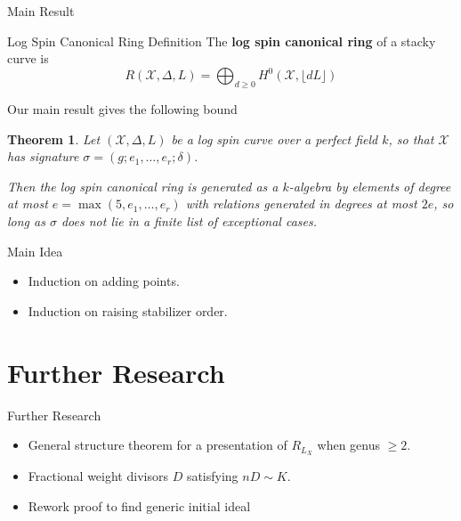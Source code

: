 \documentclass{beamer}
\newtheorem{thm}{Theorem}
\theoremstyle{remark}
\newcommand \sx{{\mathscr X}}
\newcommand{\halfcan}{L}
\begin{document}

\begin{frame}{Main Result}
\begin{alertblock}{Log Spin Canonical Ring Definition}
The \textbf{log spin canonical ring} of a stacky curve is
\[
	R(\sx, \Delta, \halfcan) = \bigoplus_{d \geq 0} H^0(\sx, \lfloor d \halfcan \rfloor)
\]
\end{alertblock}

Our main result gives the following bound


\begin{thm}
\label{thm:main}
Let $(\sx, \Delta, \halfcan)$ be a log spin curve over a perfect
field $k$, so that $\sx$ has signature $\sigma = (g; e_1, \ldots,
e_r; \delta)$.

Then the log spin canonical ring is generated as a $k$-algebra by 
elements of degree at most $e = \max(5, e_1, \ldots, e_r)$ with
relations generated in degrees at most $2e$,
so long as $\sigma$ does not lie in a finite list of exceptional
cases.
\end{thm}

\end{frame}


\begin{frame}{Main Idea}
\begin{itemize}
\item Induction on adding points. \\
\item Induction on raising stabilizer order. \\
\end{itemize}

\end{frame}

\section{Further Research} 

\begin{frame}{Further Research}
\begin{itemize}
\item General structure theorem for a presentation of $R_{L_X}$ when genus $\ge 2$. \\
\item Fractional weight divisors $D$ satisfying $nD \sim K$. \\
\item Rework proof to find generic initial ideal \\
\end{itemize}

\end{frame}
\end{document}
